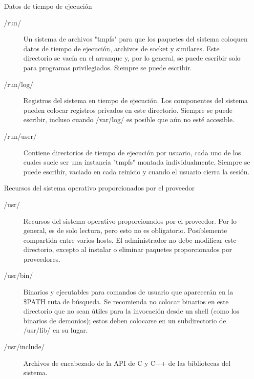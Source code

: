 \begin{frame}[c]{Datos de tiempo de ejecución}
  \begin{description}
    \item [/run/] Un sistema de archivos "tmpfs" para que los paquetes del
			sistema coloquen datos de tiempo de ejecución, archivos de socket y
			similares. Este directorio se vacía en el arranque y, por lo general,
			se puede escribir solo para programas privilegiados. Siempre se
			puede escribir.
    \pausa
    \item [/run/log/] Registros del sistema en tiempo de ejecución. Los
			componentes del sistema pueden colocar registros privados en este
			directorio. Siempre se puede escribir, incluso cuando /var/log/ es
			posible que aún no esté accesible.
    \pausa
    \item [/run/user/] Contiene directorios de tiempo de ejecución por
			usuario, cada uno de los cuales suele ser una instancia "tmpfs" montada
			individualmente. Siempre se puede escribir, vaciado en cada reinicio y
			cuando el usuario cierra la sesión.
  \end{description}
\end{frame}

\begin{frame}[c]{Recursos del sistema operativo proporcionados por el proveedor}
  \begin{description}
    \item [/usr/] Recursos del sistema operativo proporcionados por el
			proveedor. Por lo general, es de solo lectura, pero esto no es
			obligatorio. Posiblemente compartida entre varios hosts.
			El administrador no debe modificar este directorio, excepto al
			instalar o eliminar paquetes proporcionados por proveedores.
    \pausa
    \item [/usr/bin/] Binarios y ejecutables para comandos de usuario que
			aparecerán en la \$PATH ruta de búsqueda. Se recomienda no colocar
			binarios en este directorio que no sean útiles para la invocación
			desde un shell (como los binarios de demonios); estos deben colocarse en
			un subdirectorio de /usr/lib/ en su lugar.
    \pausa
    \item [/usr/include/] Archivos de encabezado de la API de C y C++ de
      las bibliotecas del sistema.
  \end{description}
\end{frame}

